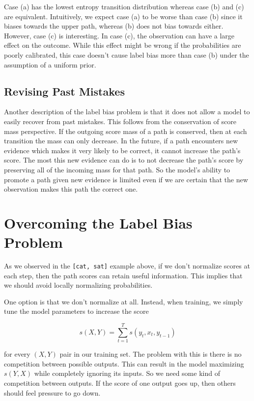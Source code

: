 \documentclass[11pt, letterpaper]{article}
\begin{document}
Case (a) has the lowest entropy transition distribution whereas case (b) and
(c) are equivalent. Intuitively, we expect case (a) to be worse than case (b)
since it biases towards the upper path, whereas (b) does not bias towards
either. However, case (c) is interesting. In case (c), the observation can have
a large effect on the outcome. While this effect might be wrong if the
probabilities are poorly calibrated, this case doesn't cause label bias more
than case (b) under the assumption of a uniform prior.

\subsection{Revising Past Mistakes}

Another description of the label bias problem is that it does not allow a model
to easily recover from past mistakes. This follows from the conservation of
score mass perspective. If the outgoing score mass of a path is conserved, then
at each transition the mass can only decrease. In the future, if a path
encounters new evidence which makes it very likely to be correct, it cannot
increase the path's score. The most this new evidence can do is to not decrease
the path's score by preserving all of the incoming mass for that path. So the
model's ability to promote a path given new evidence is limited even if we are
certain that the new observation makes this path the correct one.

\section{Overcoming the Label Bias Problem}

As we observed in the \texttt{[cat, sat]} example above, if we don't normalize
scores at each step, then the path scores can retain useful information. This
implies that we should avoid locally normalizing probabilities.

One option is that we don't normalize at all. Instead, when training, we simply
tune the model parameters to increase the score

\begin{equation}
    s(X, Y) = \sum_{t=1}^T s(y_t, x_t, y_{t-1})
\end{equation}

for every $(X, Y)$ pair in our training set. The problem with this is there is
no competition between possible outputs. This can result in the model
maximizing $s(Y, X)$ while completely ignoring its inputs. So we need some kind
of competition between outputs. If the score of one output goes up, then others
should feel pressure to go down.
\end{document}
